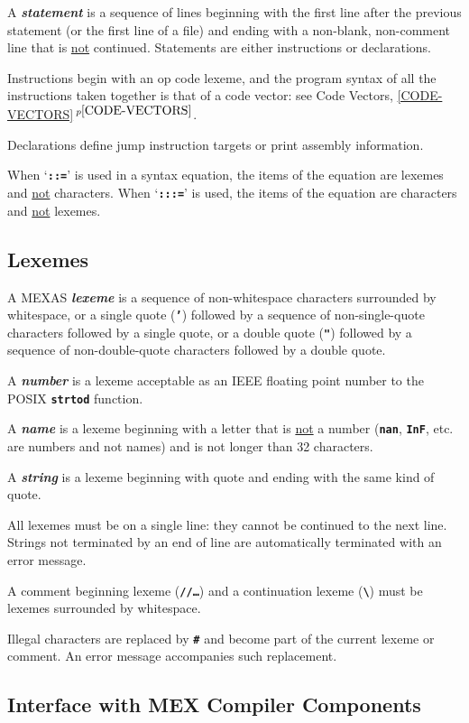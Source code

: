 \documentclass[12pt]{article}
\makeatletter
\newcommand{\TT}[1]{{\tt \bfseries #1}}
\newcommand{\key}[1]{{\bf \em #1}\index{#1}}
\newcommand{\ttkey}[1]{\TT{#1}\index{#1@{\tt #1}}}
\newcommand{\itemref}[1]{\ref{#1}$\,^{p\pageref{#1}}$}
\makeatother
\begin{document}
A \key{statement} is a sequence of lines beginning with the first
line after the previous statement (or the first line of a file)
and ending with a non-blank, non-comment line that is
\underline{not} continued.  Statements are either instructions or
declarations.

Instructions begin with an op code lexeme, and the program syntax
of all the instructions taken together
is that of a code vector: see Code Vectors,
\itemref{CODE-VECTORS}.

Declarations define jump instruction targets or print assembly
information.

When `\ttkey{::=}' is used in a syntax equation, the
items of the equation are lexemes and \underline{not}
characters.
When `\ttkey{:::=}' is used, the
items of the equation are characters and \underline{not}
lexemes.

\subsection{Lexemes}

A MEXAS \key{lexeme} is a sequence of non-whitespace characters
surrounded by whitespace, or a single quote (\TT{'}) followed
by a sequence of non-single-quote characters followed by a
single quote, or a double quote (\TT{"}) followed by a 
sequence of non-double-quote characters followed by a
double quote.

A \key{number}\label{NUMBER} is a lexeme acceptable as an IEEE floating point
number to the POSIX \TT{strtod} function.

A \key{name}\label{NAME} is a lexeme beginning with a letter that is
\underline{not} a number (\TT{nan}, \TT{InF}, etc. are numbers
and not names) and is not longer than 32 characters.

A \key{string}\label{STRING} is a lexeme beginning with quote and ending
with the same kind of quote.

All lexemes must be on a single line: they cannot be continued to the
next line.  Strings not terminated by an end of line are automatically
terminated with an error message.

A comment beginning lexeme (\TT{//\ldots}) and a continuation
lexeme (\TT{\textbackslash}) must be lexemes surrounded by whitespace.

Illegal characters are replaced by \TT{\#} and become part of the
current lexeme or comment.  An error message accompanies such replacement.

\subsection{Interface with MEX Compiler Components}
\label{INTERFACE-WITH-MEX-COMPILER-COMPONENTS}
\end{document}
